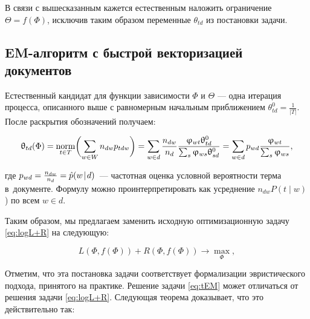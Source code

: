 В связи с вышесказанным кажется естественным наложить ограничение $\Theta = f(\Phi)$, исключив таким образом переменные $\theta_{td}$ из постановки задачи. 

\subsection{EM-алгоритм с быстрой векторизацией документов}

Естественный кандидат для функции зависимости $\Phi$ и $\Theta$ --- одна итерация процесса, описанного выше с равномерным начальным приближением $\theta^0_{td} = \frac1{|T|}$. После раскрытия обозначений получаем:

\begin{equation}
\label{eq:thetaform}
    \uptheta_{td}(\Phi)
    = \mathop{\mathrm{norm}}\limits_{t\in T} \biggl( \sum_{w\in W} n_{dw} p_{tdw} \biggr)
    = \sum_{w\in d} \frac{n_{dw}}{n_d} \frac{\upvarphi_{wt} \uptheta^0_{td}}{\sum_s \upvarphi_{ws} \uptheta^0_{sd}}
    = \sum_{w\in d} p_{wd} \frac{\upvarphi_{wt}}{\sum_s \upvarphi_{ws}},
\end{equation}

где $p_{wd} = \frac{n_{dw}}{n_d} = \hat p(w\mspace{2mu}{|}\mspace{2mu} d)$~--- частотная оценка условной вероятности терма в~документе. Формулу можно проинтерпретировать как усреднение $n_{dw} P(t \mid w)$) по всем $w \in d$.

Таким образом, мы предлагаем заменить исходную оптимизационную задачу \ref{eq:logL+R} на следующую:

\begin{equation} \label{eq:tEM}
L(\Phi, f(\Phi) ) + R(\Phi, f(\Phi) ) \to \max_{\Phi},
\end{equation}

Отметим, что эта постановка задачи соответствует формализации эвристического подхода, принятого на практике. Решение задачи \ref{eq:tEM} может отличаться от решения задачи \ref{eq:logL+R}. Следующая теорема доказывает, что это действительно так:


